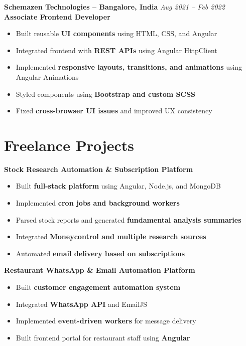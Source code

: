 \documentclass[11pt,a4paper]{article}
\begin{document}
\vspace{6pt}

\textbf{Schemazen Technologies -- Bangalore, India} \hfill \textit{Aug 2021 -- Feb 2022} \\
\textbf{Associate Frontend Developer}
\begin{itemize}[leftmargin=*]
\item Built reusable \textbf{UI components} using HTML, CSS, and Angular
\item Integrated frontend with \textbf{REST APIs} using Angular HttpClient
\item Implemented \textbf{responsive layouts, transitions, and animations} using Angular Animations
\item Styled components using \textbf{Bootstrap and custom SCSS}
\item Fixed \textbf{cross-browser UI issues} and improved UX consistency
\end{itemize}

\section*{Freelance Projects}

\textbf{Stock Research Automation \& Subscription Platform}
\begin{itemize}[leftmargin=*]
\item Built \textbf{full-stack platform} using Angular, Node.js, and MongoDB
\item Implemented \textbf{cron jobs and background workers}
\item Parsed stock reports and generated \textbf{fundamental analysis summaries}
\item Integrated \textbf{Moneycontrol and multiple research sources}
\item Automated \textbf{email delivery based on subscriptions}
\end{itemize}

\textbf{Restaurant WhatsApp \& Email Automation Platform}
\begin{itemize}[leftmargin=*]
\item Built \textbf{customer engagement automation system}
\item Integrated \textbf{WhatsApp API} and EmailJS
\item Implemented \textbf{event-driven workers} for message delivery
\item Built frontend portal for restaurant staff using \textbf{Angular}
\end{itemize}
\end{document}
